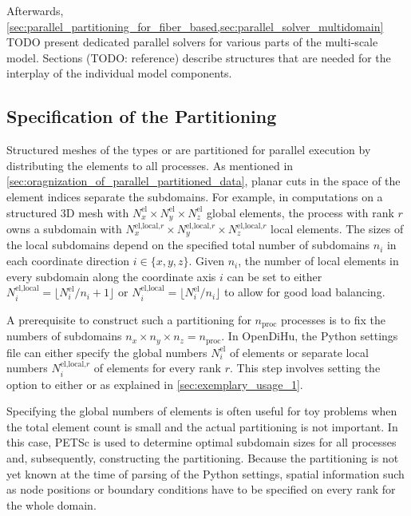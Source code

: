 Afterwards, \cref{sec:parallel_partitioning_for_fiber_based,sec:parallel_solver_multidomain} TODO present dedicated parallel solvers for various parts of the multi-scale model. Sections (TODO: reference) describe structures that are needed for the interplay of the individual model components.


\subsection{Specification of the Partitioning}\label{sec:algorithm_for_partitioning_and_sampling}

Structured meshes of the types  or  are partitioned for parallel execution by distributing the elements to all processes. As mentioned in \cref{sec:oragnization_of_parallel_partitioned_data}, planar cuts in the space of the element indices separate the subdomains. For example, in computations on a structured 3D mesh with $N_x^\text{el} \times N_y^\text{el} \times N_z^\text{el}$ global elements, the process with rank $r$ owns a subdomain with
$N_x^{\text{el,local,}r} \times N_y^{\text{el,local,}r} \times N_z^{\text{el,local,}r}$ local elements.
The sizes of the local subdomains depend on the specified total number of subdomains $n_i$ in each coordinate direction $i \in \{x,y,z\}$.
Given $n_i$, the number of local elements in every subdomain along the coordinate axis $i$ can be set to either $N_i^{\text{el,local}} = \lfloor N^\text{el}_i/n_i+1\rfloor$ or $N_i^{\text{el,local}} = \lfloor N^\text{el}_i/n_i \rfloor$ to allow for good load balancing.

A prerequisite to construct such a partitioning for $n_\text{proc}$ processes is to fix the numbers of subdomains $n_x \times n_y \times n_z = n_\text{proc}$. In OpenDiHu, the Python settings file can either specify the global numbers $N_i^\text{el}$ of elements or separate local numbers $N_i^{\text{el,local,}r}$ of elements for every rank $r$. This step involves setting the option  to either  or  as explained in \cref{sec:exemplary_usage_1}.

Specifying the global numbers of elements is often useful for toy problems when the total element count is small and the actual partitioning is not important. In this case, PETSc is used to determine optimal subdomain sizes for all processes and, subsequently, constructing the partitioning. Because the partitioning is not yet known at the time of parsing of the Python settings, spatial information such as node positions or boundary conditions have to be specified on every rank for the whole domain.

